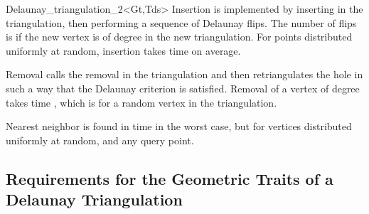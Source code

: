 \begin{ccClassTemplate} {Delaunay_triangulation_2<Gt,Tds>}
Insertion is implemented by inserting in the triangulation, then
performing a sequence of Delaunay flips. The number of flips is 
if the new vertex is of degree  in the new triangulation. For
points distributed uniformly at random, insertion takes time  on
average.

Removal calls the removal in the triangulation and then retriangulates
the hole in such a way that  the Delaunay criterion is satisfied. Removal of a
vertex of degree  takes time ,
which is  for a random
vertex in the triangulation.

Nearest neighbor is found in time  in the worst case, but 
for vertices distributed uniformly at random, and any query point. 

\end{ccClassTemplate} 

\subsection{Requirements for the Geometric Traits of a Delaunay Triangulation}
\label{I1_Sect_Delaunay_geom_traits}

